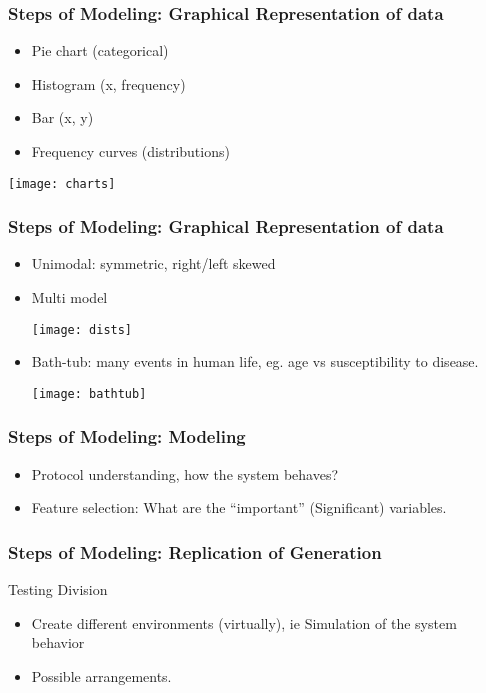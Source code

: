 \begin{frame}[fragile]\frametitle{Steps of Modeling: Graphical Representation of data}

\begin{itemize}
\item Pie chart (categorical)
\item Histogram (x, frequency)
\item Bar (x, y)
\item Frequency curves (distributions)
\end{itemize}
\begin{center}
\texttt{[image: charts]}
\end{center}
\end{frame}

\begin{frame}[fragile]\frametitle{Steps of Modeling: Graphical Representation of data}
\begin{itemize}
\item Unimodal: symmetric, right/left skewed
\item Multi model
\begin{center}
\texttt{[image: dists]}
\end{center}
\item Bath-tub: many events in human life, eg. age vs susceptibility to disease.
\begin{center}
\texttt{[image: bathtub]}
\end{center}
\end{itemize}

\end{frame}

\begin{frame}[fragile]\frametitle{Steps of Modeling: Modeling}

\begin{itemize}
\item Protocol understanding, how the system behaves?
\item Feature selection: What are the ``important'' (Significant) variables.
\end{itemize}
\end{frame}

\begin{frame}[fragile]\frametitle{Steps of Modeling: Replication of Generation}
Testing Division
\begin{itemize}
\item Create different environments (virtually), ie Simulation  of the system behavior
\item Possible arrangements.
\end{itemize}
\end{frame}

